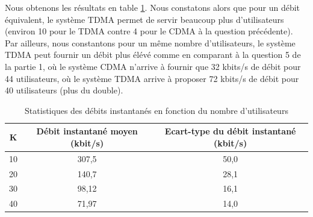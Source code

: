 \documentclass[a4paper,11pt,2]{article}
\begin{document}
Nous obtenons les résultats en table \ref{tab:III2}. Nous constatons alors que pour un débit équivalent, le système TDMA permet de servir beaucoup plus d'utilisateurs (environ 10 pour le TDMA contre 4 pour le CDMA à la question précédente). Par ailleurs, nous constantons pour un même nombre d'utilisateurs, le système TDMA peut fournir un débit plus élévé comme en comparant à la question 5 de la partie 1, où le système CDMA n'arrive à fournir que 32 kbits/s de débit pour 44 utilisateurs, où le système TDMA arrive à proposer 72 kbits/s de débit pour 40 utilisateurs (plus du double).

\begin{table}[h]
\centering
\begin{tabular}{|c|c|c|}
\hline
K & Débit instantané moyen (kbit/s) & Ecart-type du débit instantané (kbit/s) \\ \hline
10 & 307,5 & 50,0 \\
20 & 140,7 & 28,1 \\
30 & 98,12 & 16,1 \\
40 & 71,97 & 14,0 \\ \hline
\end{tabular}
\caption{Statistiques des débits instantanés en fonction du nombre d'utilisateurs}
\label{tab:III2}
\end{table}
\end{document}
